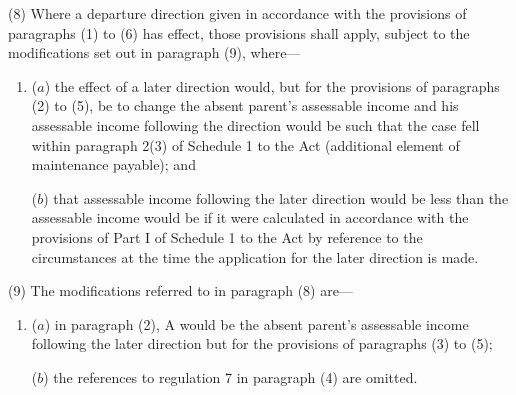 \documentclass[12pt,a4paper]{article}
\begin{document}


(8) Where a departure direction given in accordance with the provisions of 
paragraphs (1) to (6)  %
has effect, those provisions shall apply, subject to the modifications set out in paragraph (9), where—
\begin{enumerate}\item[]
($a$) the effect of a later direction would, but for the provisions of paragraphs
(2) to (5), be to change the absent parent’s assessable income and his
assessable income following the direction would be such that the case fell
within paragraph 2(3) of Schedule 1 to the Act (additional element of
maintenance payable); and

($b$) that assessable income following the later direction would be less than the
assessable income would be if it were calculated in accordance with the
provisions of Part I of Schedule 1 to the Act by reference to the circumstances
at the time the application for the later direction is made.
\end{enumerate}

(9) The modifications referred to in paragraph (8) are—
\begin{enumerate}\item[]
($a$) in paragraph (2), A would be the absent parent’s assessable income following
the later direction but for the provisions of paragraphs (3) to (5);

($b$) the references to regulation 7 in paragraph (4) are omitted.
\end{enumerate}

\end{document}
